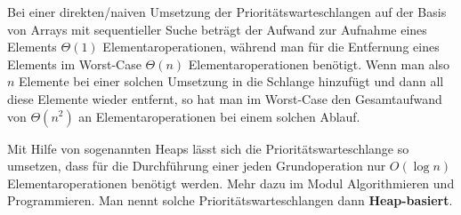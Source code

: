 \begin{bem}
	Bei einer direkten/naiven Umsetzung der Prioritätswarteschlangen auf der Basis von Arrays mit sequentieller Suche beträgt der Aufwand zur Aufnahme eines Elements $\Theta(1)$ Elementaroperationen, während man für die Entfernung eines Elements im Worst-Case $\Theta(n)$ Elementaroperationen benötigt. Wenn man also $n$ Elemente bei einer solchen Umsetzung in die Schlange hinzufügt und dann all diese Elemente wieder entfernt, so hat man im Worst-Case den Gesamtaufwand von $\Theta(n^2)$ an Elementaroperationen bei einem solchen Ablauf.
\end{bem} 

\begin{bem}
	Mit Hilfe von sogenannten Heaps lässt sich die Prioritätswarteschlange so umsetzen, dass für die Durchführung einer jeden Grundoperation nur $O(\log n)$ Elementaroperationen benötigt werden. Mehr dazu im Modul \glqq Algorithmieren und Programmieren\grqq. Man nennt solche Prioritätswarteschlangen dann \textbf{Heap-basiert}.
\end{bem} 


